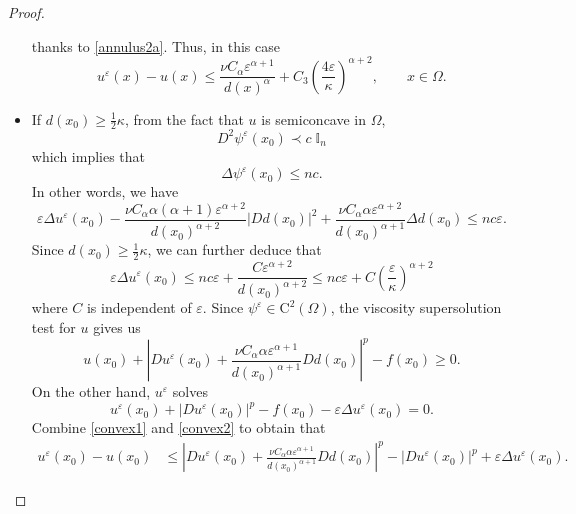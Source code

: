 \documentclass[12pt,reqno]{amsart}
\numberwithin{figure}{section}
\theoremstyle{plain}
\theoremstyle{remark}
\numberwithin{equation}{section}
\newcommand{\rmC}{\mathrm{C}}
\begin{document}
\begin{proof}
\begin{itemize}
    thanks to \eqref{annulus2a}. Thus, in this case
    \begin{equation*}
        u^\varepsilon(x) - u(x) \leq \frac{\nu C_\alpha \varepsilon^{\alpha+1}}{d(x)^\alpha} + C_3 \left(\frac{4\varepsilon}{\kappa}\right)^{\alpha+2}, \qquad x\in \Omega.
    \end{equation*}
    \item If $\displaystyle d(x_0) \geq \frac{1}{2}\kappa$, from the fact that $u$ is semiconcave in $\Omega$, 
\begin{equation*}
    D^2\psi^\varepsilon(x_0) \prec c\;\mathbb{I}_n
\end{equation*}
which implies that
\begin{equation*}
    \Delta \psi^\varepsilon(x_0) \leq nc.
\end{equation*}
In other words, we have
\begin{equation*}
    \varepsilon\Delta u^\varepsilon (x_0) - \frac{\nu C_\alpha \alpha(\alpha+1)\varepsilon^{\alpha+2}}{d(x_0)^{\alpha+2}}| Dd(x_0)|^2 + \frac{\nu C_\alpha \alpha \varepsilon^{\alpha+2}}{d(x_0)^{\alpha+1}}\Delta d(x_0) \leq nc\varepsilon.
\end{equation*}
Since $d(x_0)\geq \frac{1}{2}\kappa$, we can further deduce that
\begin{equation}\label{delta_psi}
    \varepsilon\Delta u^\varepsilon(x_0) \leq nc\varepsilon + \frac{C\varepsilon^{\alpha+2}}{d(x_0)^{\alpha+2}} \leq nc\varepsilon +  C\left(\frac{\varepsilon}{\kappa}\right)^{\alpha+2}
\end{equation}
where $C$ is independent of $\varepsilon$. Since $\psi^\varepsilon\in \rmC^2(\Omega)$, the viscosity supersolution test for $u$ gives us
\begin{equation}\label{convex1}
    u(x_0) + \left|Du^\varepsilon(x_0) + \frac{\nu C_\alpha \alpha \varepsilon^{\alpha+1}}{d(x_0)^{\alpha+1}}D d(x_0)\right|^p - f(x_0) \geq 0.
\end{equation}
On the other hand, $u^\varepsilon$ solves
\begin{equation}\label{convex2}
    u^\varepsilon(x_0) + |Du^\varepsilon(x_0)|^p - f(x_0) - \varepsilon \Delta u^\varepsilon(x_0) = 0.
\end{equation}
Combine \eqref{convex1} and \eqref{convex2} to obtain that
\begin{align}\label{convex3}
    u^\varepsilon(x_0) - u(x_0) &\leq \left|Du^\varepsilon(x_0) + \frac{\nu C_\alpha \alpha \varepsilon^{\alpha+1}}{d(x_0)^{\alpha+1}}D d(x_0)\right|^p - |Du^\varepsilon(x_0)|^p + \varepsilon\Delta u^\varepsilon(x_0).

\end{align}
\end{itemize}
\end{proof}
\end{document}
